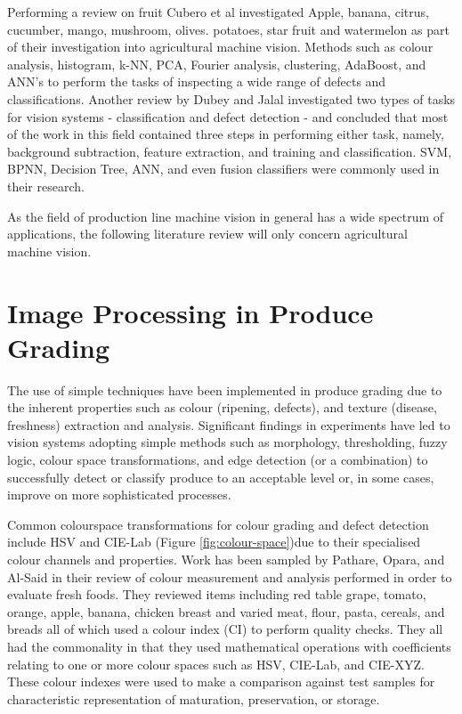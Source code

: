 \documentclass[fleqn,twoside,12pt]{report}
\begin{document}
Performing a review on fruit Cubero et al \cite{cubero} investigated Apple, banana, citrus, cucumber, mango, mushroom, olives. potatoes, star fruit and watermelon as part of their investigation into agricultural machine vision. Methods such as colour analysis, histogram, k-NN, PCA, Fourier analysis, clustering, AdaBoost, and ANN's to perform the tasks of inspecting a wide range of defects and classifications. Another review by Dubey and Jalal \cite{dubey} investigated two types of tasks for vision systems - classification and defect detection - and concluded that most of the work in this field contained three steps in performing either task, namely, background subtraction, feature extraction, and training and classification. SVM, BPNN, Decision Tree, ANN, and even fusion classifiers were commonly used in their research.

As the field of production line machine vision in general has a wide spectrum of applications, the following literature review will only concern agricultural machine vision. 


\section{Image Processing in Produce Grading}

 
The use of simple techniques have been implemented in produce grading due to the inherent properties such as colour (ripening, defects), and texture (disease, freshness) extraction and analysis. Significant findings in experiments have led to vision systems adopting simple methods such as morphology, thresholding, fuzzy logic, colour space transformations, and edge detection (or a combination) to successfully detect or classify produce to an acceptable level or, in some cases, improve on more sophisticated processes.

Common colourspace transformations for colour grading and defect detection include HSV and CIE-Lab (Figure \ref{fig:colour-space})due to their specialised colour channels and properties. Work has been sampled by Pathare, Opara, and Al-Said \cite{pathare} in their review of colour measurement and analysis performed in order to evaluate fresh foods. They reviewed items including red table grape, tomato, orange, apple, banana, chicken breast and varied meat, flour, pasta, cereals, and breads all of which used a colour index (CI) to perform quality checks. They all had the commonality in that they used mathematical operations with coefficients relating to one or more colour spaces such as HSV, CIE-Lab, and CIE-XYZ. These colour indexes were used to make a comparison against test samples for characteristic representation of maturation, preservation, or storage. 
\end{document}
